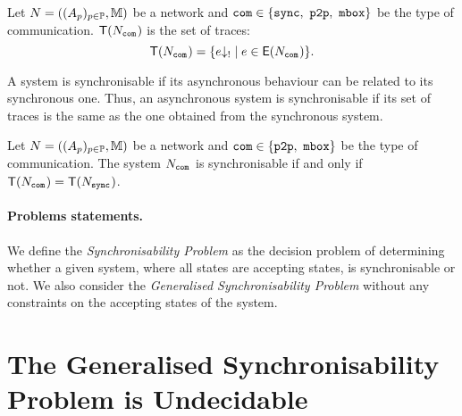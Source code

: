 \documentclass[submission,copyright,creativecommons,UKenglish]{eptcs}
\begin{document}
\begin{definition}[Traces]\label{def:traces}
	Let $N = \left((A_{p})_{p\in \mathbb{P}}, \mathbb{M} \right)$ be a network and  $\mathtt{com}\in \{\mathtt{sync},~ \mathtt{p2p},~\mathtt{mbox}\}$ be the type of communication.
	$\mathsf{T}(N_{{\mathtt{com}}^{}})$ is the set of traces: $$\mathsf{T}(N_{{\mathtt{com}}^{}}) = \{e{\downarrow_{!}} \mid e \in \mathsf{E}(N_{{\mathtt{com}}^{}})\}.$$	
\end{definition}


A system is synchronisable if its asynchronous behaviour can be related to its synchronous one. Thus, an asynchronous system is synchronisable if its set of traces is the same as the one obtained from the synchronous system. 

\begin{definition}[Synchronisability]\label{def:synchronisability}
Let $N = \left((A_{p})_{p\in \mathbb{P}}, \mathbb{M}\right)$ be a network and  $\mathtt{com}\in \{\mathtt{p2p},~\mathtt{mbox}\}$ be the type of communication. The system $N_{{\mathtt{com}}^{}}$ is synchronisable if and only if 
$\mathsf{T}(N_{{\mathtt{com}}^{}}) = \mathsf{T}(N_{{\mathtt{sync}}^{}})$. 
\end{definition} 

\paragraph*{Problems statements.} 
We define the \emph{Synchronisability Problem} as the decision problem of determining whether a given system, where all states are accepting states, is synchronisable or not. 
We also consider the \emph{Generalised Synchronisability Problem} without any constraints on the accepting states of the system. 




 


\section{The Generalised Synchronisability Problem is Undecidable}\label{sec:post}



 




\end{document}
